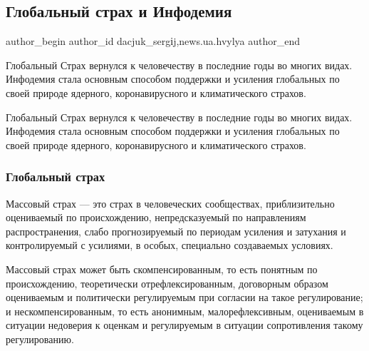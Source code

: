  
 
 
 
 
\subsection{Глобальный страх и Инфодемия}
\label{sec:12_01_2022.stz.news.ua.hvylya.1.globalnyj_strah_infodemia}

\ifcmt
 author_begin
   author_id dacjuk_sergіj,news.ua.hvylya
 author_end
\fi

\begin{zznagolos}
Глобальный Страх вернулся к человечеству в последние годы во многих видах.
Инфодемия стала основным способом поддержки и усиления глобальных по своей
природе ядерного, коронавирусного и климатического страхов.	
\end{zznagolos}

Глобальный Страх вернулся к человечеству в последние годы во многих видах.
Инфодемия стала основным способом поддержки и усиления глобальных по своей
природе ядерного, коронавирусного и климатического страхов.

\subsubsection{Глобальный страх}

Массовый страх — это страх в человеческих сообществах, приблизительно
оцениваемый по происхождению, непредсказуемый по направлениям распространения,
слабо прогнозируемый по периодам усиления и затухания и контролируемый с
усилиями, в особых, специально создаваемых условиях.


Массовый страх может быть скомпенсированным, то есть понятным по происхождению,
теоретически отрефлексированным, договорным образом оцениваемым и политически
регулируемым при согласии на такое регулирование; и нескомпенсированным, то
есть анонимным, малорефлексивным, оцениваемым в ситуации недоверия к оценкам и
регулируемым в ситуации сопротивления такому регулированию.

